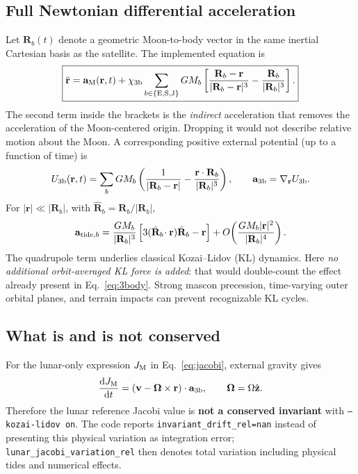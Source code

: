 \documentclass[11pt,a4paper]{article}
\newcommand{\opt}[1]{\texttt{#1}}
\newcommand{\pathcode}[1]{\nolinkurl{#1}}
\begin{document}
\subsection{Full Newtonian differential acceleration}
Let \(\mathbf R_b(t)\) denote a geometric Moon-to-body vector in the same inertial Cartesian basis as the satellite. The implemented equation is
\begin{equation}
\boxed{\ddot{\mathbf r}=\mathbf a_{\rm M}(\mathbf r,t)+\chi_{\rm 3b}
\sum_{b\in\{\mathrm E,\mathrm S,\mathrm J\}}GM_b\left[
{\mathbf R_b-\mathbf r\over|\mathbf R_b-\mathbf r|^3}
-{\mathbf R_b\over|\mathbf R_b|^3}\right].}
\label{eq:3body}
\end{equation}
The second term inside the brackets is the \emph{indirect} acceleration that removes the acceleration of the Moon-centered origin. Dropping it would not describe relative motion about the Moon. A corresponding positive external potential (up to a function of time) is
\begin{equation}
U_{\rm 3b}(\mathbf r,t)=\sum_b GM_b\left(
{1\over|\mathbf R_b-\mathbf r|}-{\mathbf r\cdot\mathbf R_b\over|\mathbf R_b|^3}\right),
\qquad \mathbf a_{\rm 3b}=\nabla_{\mathbf r}U_{\rm 3b}.
\end{equation}
For \(|\mathbf r|\ll |\mathbf R_b|\), with \(\hat{\mathbf R}_b=\mathbf R_b/|\mathbf R_b|\),
\begin{equation}
\mathbf a_{{\rm tide},b}={GM_b\over|\mathbf R_b|^3}
\left[3(\hat{\mathbf R}_b\!\cdot\mathbf r)\hat{\mathbf R}_b-\mathbf r\right]
+O\!\left({GM_b|\mathbf r|^2\over|\mathbf R_b|^4}\right).
\label{eq:tidal}
\end{equation}
The quadrupole term underlies classical Kozai--Lidov (KL) dynamics. Here \emph{no additional orbit-averaged KL force is added}: that would double-count the effect already present in Eq.~\eqref{eq:3body}. Strong mascon precession, time-varying outer orbital planes, and terrain impacts can prevent recognizable KL cycles.

\subsection{What is and is not conserved}
For the lunar-only expression \(J_{\rm M}\) in Eq.~\eqref{eq:jacobi}, external gravity gives
\begin{equation}
{\mathrm dJ_{\rm M}\over\mathrm dt}=
\left(\mathbf v-\boldsymbol\Omega\times\mathbf r\right)\cdot\mathbf a_{\rm 3b},
\qquad \boldsymbol\Omega=\Omega\hat{\mathbf z}.
\label{eq:jacobiderivative}
\end{equation}
Therefore the lunar reference Jacobi value is \textbf{not a conserved invariant} with \opt{--kozai-lidov on}. The code reports \pathcode{invariant_drift_rel=nan} instead of presenting this physical variation as integration error; \pathcode{lunar_jacobi_variation_rel} then denotes total variation including physical tides and numerical effects.
\end{document}
